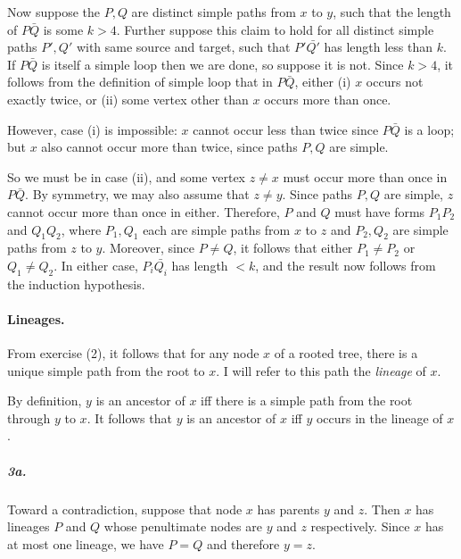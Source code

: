 \documentclass[
]{article}
\begin{document}
Now suppose the $P,Q$ are distinct simple paths from $x$ to $y$, such that the length of $P\bar Q$ is some $k>4$.  Further suppose this claim to hold for all distinct simple paths $P',Q'$ with same source and target, such that $P'\bar {Q'}$ has length less than $k$.  If $P\bar Q$ is itself a simple loop then we are done, so suppose it is not.  Since $k>4$, it follows from the definition of simple loop that in $P\bar Q$, either (i) $x$ occurs not exactly twice, or (ii) some vertex other than $x$ occurs more than once.  

However, case (i) is impossible:  $x$ cannot occur less than twice since  $P\bar Q$ is a loop; but  $x$ also cannot occur more than twice, since paths $P,Q$ are simple.

So we must be in case (ii), and some vertex $z\neq x$ must occur more than once in $P\bar Q$. By symmetry, we may also assume that $z\neq y$.  Since paths $P,Q$ are simple, $z$ cannot occur more than once in either.  Therefore, $P$ and $Q$ must have forms $P_1P_2$ and $Q_1Q_2$, where $P_1, Q_1$ each are simple paths from $x$ to $z$ and $P_2, Q_2$ are simple paths from $z$ to $y$.  Moreover, since $P\neq Q$, it follows that either $P_1\neq P_2$ or $Q_1\neq Q_2$.  In either case,  $P_i \bar{Q_i}$ has length $<k$, and the result now follows from the induction hypothesis.


\paragraph{Lineages.}  From exercise (2), it follows that for any node $x$ of a rooted tree, there is a unique simple path from the root to $x$.  I will refer to this path the \emph{lineage} of $x$.  

By definition, $y$ is an ancestor of $x$ iff there is a simple path from the root through $y$ to $x$.  It follows that $y$ is an ancestor of $x$ iff $y$ occurs in the lineage of $x$.  



\subparagraph{3a.} 
Toward a contradiction, suppose that node $x$ has parents $y$ and $z$.  Then $x$ has lineages $P$ and $Q$ whose penultimate nodes are $y$ and $z$ respectively.  Since $x$ has at most one lineage, we have $P=Q$ and therefore $y=z$.
\end{document}
